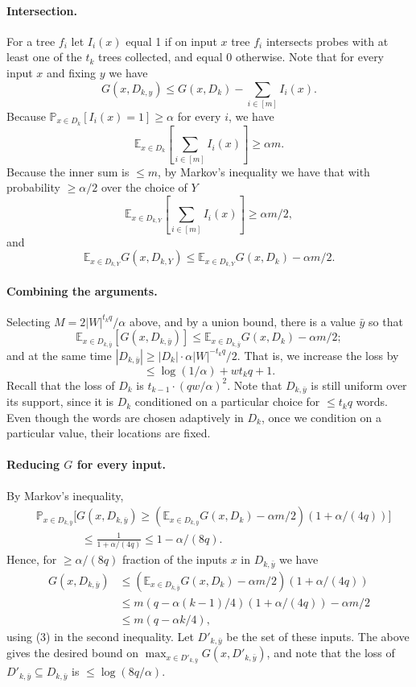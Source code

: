 \paragraph{Intersection.}
For a tree $f_i$ let $I_i(x)$ equal 1 if on input $x$ tree $f_i$ intersects probes with at least one of the $t_k$ trees collected, and equal 0 otherwise. Note that for every input $x$ and fixing $y$ we have
\[G(x,D_{k,y})\leq G(x,D_k)-\sum_{i\in[m]}I_i(x).\]
Because $\mathbb P_{x\in D_k}[I_i(x)=1]\geq\alpha$ for every $i$, we have
\[\mathbb E_{x\in D_k}\left[\sum_{i\in[m]}I_i(x)\right]\geq\alpha m.\]
Because the inner sum is $\leq m$, by Markov's inequality we have that with probability $\geq\alpha/2$ over the choice of $Y$
\[\mathbb E_{x\in D_{k,Y}}\left[\sum_{i\in[m]}I_i(x)\right]\geq\alpha m/2,\]
and
\[\mathbb E_{x\in D_{k,Y}}G(x,D_{k,Y})\leq\mathbb E_{x\in D_{k,Y}}G(x,D_k)-\alpha m/2.\]
\paragraph{Combining the arguments.}
Selecting $M=2|W|^{t_kq}/\alpha$ above, and by a union bound, there is a value $\bar y$ so that
\[\mathbb E_{x\in D_{k,\bar y}}[G(x,D_{k,\bar y})]\leq\mathbb E_{x\in D_{k,\bar y}}G(x,D_k)-\alpha m/2;\]
and at the same time $|D_{k,\bar y}|\geq|D_k|\cdot\alpha|W|^{-t_kq}/2$. That is, we increase the loss by
\[\leq\log(1/\alpha)+wt_kq+1.\]
Recall that the loss of $D_k$ is $t_{k-1}\cdot(qw/\alpha)^2$.
Note that $D_{k,\bar y}$ is still uniform over its support, since it is $D_k$ conditioned on a particular choice for $\leq t_kq$ words. Even though the words are chosen adaptively in $D_k$, once we condition on a particular value, their locations are fixed.
\paragraph{Reducing $G$ for every input.}
By Markov's inequality,
\begin{align*}
&\mathbb P_{x\in D_{k,\bar y}}\bigl[G(x,D_{k,\bar y})\geq(\mathbb E_{x\in D_{k,\bar y}}G(x,D_k)-\alpha m/2)(1+\alpha/(4q))\bigr]\\
&\hspace{4em}\leq\frac1{1+\alpha/(4q)}\leq1-\alpha/(8q).
\end{align*}
Hence, for $\geq\alpha/(8q)$ fraction of the inputs $x$ in $D_{k,\bar y}$ we have
\begin{align*}
G(x,D_{k,\bar y})&\leq(\mathbb E_{x\in D_{k,\bar y}}G(x,D_k)-\alpha m/2)(1+\alpha/(4q))\\
&\leq m(q-\alpha(k-1)/4)(1+\alpha/(4q))-\alpha m/2\\
&\leq m(q-\alpha k/4),
\end{align*}
using (3) in the second inequality. Let $D'_{k,\bar y}$ be the set of these inputs. The above gives the desired bound on $\max_{x\in D'_{k,\bar y}}G(x,D'_{k,\bar y})$, and note that the loss of $D'_{k,\bar y}\subseteq D_{k,\bar y}$ is $\leq\log(8q/\alpha)$.
